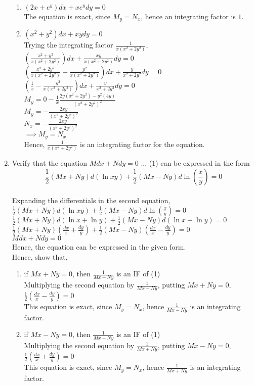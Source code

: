 \documentclass[a4paper]{article}
\begin{document}
\begin{enumerate}
{\begin{enumerate}
{}
\item{$(2x+e^y)dx+xe^ydy=0$
\\The equation is exact, since $M_y=N_x$, hence an integrating factor is $1$.
}
\item{$(x^2+y^2)dx+xydy=0$
\\Trying the integrating factor $\frac{1}{x(x^2+2y^2)}$,
\\$(\frac{x^2+y^2}{x(x^2+2y^2)})dx+\frac{xy}{x(x^2+2y^2)}dy=0$
\\$(\frac{x^2+2y^2}{x(x^2+2y^2)}-\frac{y^2}{x(x^2+2y^2)})dx+\frac{y}{x^2+2y^2}dy=0$
\\$(\frac{1}{x}-\frac{y^2}{x(x^2+2y^2)})dx+\frac{y}{x^2+2y^2}dy=0$
\\$M_y=0-\frac{1}{x}\frac{2y(x^2+2y^2)-y^2(4y)}{(x^2+2y^2)^2}$
\\$M_y=-\frac{2xy}{(x^2+2y^2)^2}$
\\$N_x=-\frac{2xy}{(x^2+2y^2)^2}$
\\$\implies M_y=N_x$
\\Hence, $\frac{1}{x(x^2+2y^2)}$ is an integrating factor for the equation.
}
\end{enumerate}
}
\item{Verify that the equation $Mdx+Ndy=0$ ... (1) can be expressed in the form \[\frac{1}{2}(Mx+Ny)d(\ln xy) + \frac{1}{2}(Mx-Ny)d\ln(\frac{x}{y})=0\]
\\Expanding the differentials in the second equation,
\\$\frac{1}{2}(Mx+Ny)d(\ln xy) + \frac{1}{2}(Mx-Ny)d\ln(\frac{x}{y})=0$
\\$\frac{1}{2}(Mx+Ny)d(\ln x+ \ln y) + \frac{1}{2}(Mx-Ny)d(\ln x -\ln y)=0$
\\$\frac{1}{2}(Mx+Ny)(\frac{dx}{x}+ \frac{dy}{y}) + \frac{1}{2}(Mx-Ny)(\frac{dx}{x}- \frac{dy}{y})=0$
\\$Mdx+Ndy=0$
\\Hence, the equation can be expressed in the given form.
\\Hence, show that,
\begin{enumerate}
\item{if $Mx+Ny=0$, then $\frac{1}{Mx-Ny}$ is an IF of (1)
\\Multiplying the second equation by $\frac{1}{Mx-Ny}$, putting $Mx+Ny=0$,
\\$\frac{1}{2}(\frac{dx}{x} - \frac{dy}{y})=0$
\\This equation is exact, since $M_y=N_x$, hence $\frac{1}{Mx-Ny}$ is an integrating factor.
}

\item{if $Mx-Ny=0$, then $\frac{1}{Mx+Ny}$ is an IF of (1)
\\Multiplying the second equation by $\frac{1}{Mx+Ny}$, putting $Mx-Ny=0$,
\\$\frac{1}{2}(\frac{dx}{x} + \frac{dy}{y})=0$
\\This equation is exact, since $M_y=N_x$, hence $\frac{1}{Mx+Ny}$ is an integrating factor.
}


\end{enumerate}}
\end{enumerate}
\end{document}

